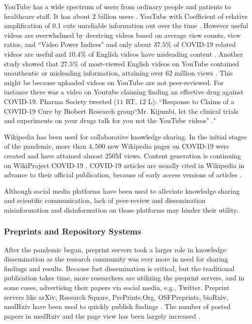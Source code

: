 \documentclass[acmsmall,authordraft]{acmart}
\begin{document}
YouTube has a wide spectrum of users from ordinary people and patients to healthcare staff. It has about $2$ billion users \citep{basnet2019quality}. YouTube with Coefficient of relative amplification of 0.1 cuts unreliable information out over the time \citep{cinelli2020covid}. However useful videos are overwhelmed by deceiving videos based on average view counts, view ratios, and ``Video Power Indices"  and only about $37.5$\% of COVID-19 related videos are useful and $10.4$\% of English videos have misleading content \citep{atac2020youtube}. Another study showed that $27.5$\% of most-viewed English videos on YouTube contained unauthentic or misleading information, attaining over $62$ million views \citep{li2020youtube}. This might be because uploaded videos on YouTube are not peer-reviewed. For instance there was a video on Youtube claiming finding an effective drug against COVID-19. Pharma Society tweeted ($11$ RT, $12$ L):  ``Response to Claims of a COVID-19 Cure by Biobert Research group``Mr. Kijumbi, let the clinical trials and experiments on your drugs talk for you not the YouTube videos" \citep{Pharma2020twitter}." 
 
Wikipedia has been used for collaborative knowledge sharing. In the initial stages of the pandemic, more than $4,500$ new Wikipedia pages on COVID-19 were created and have attained almost $250$M views. Content generation is continuing on WikiProject COVID-19 \citep{colavizza2020covid}. COVID-19 articles are usually cited in Wikipedia in advance to their official publication, because of early access versions of articles \citep{colavizza2020covid}.

Although social media platforms have been used to alleviate knowledge sharing and scientific communication, lack of peer-review and dissemination misinformation and disinformation on those platforms \citep{zarocostas2020fight} may hinder their utility.



\subsubsection{Preprints and Repository Systems}
\label{Preprints and Repository Systems}
After the pandemic began, preprint servers took a larger role in knowledge dissemination as the research community was ever more in need for sharing findings and results. Because fast dissemination is critical, but the traditional publication takes time, more researchers are utilizing the preprint servers, and in some cases, advertising their papers via social media, e.g., Twitter. Preprint servers like arXiv, Research Square, PrePrints.Org, OSFPreprints, bioRxiv, medRxiv have been used to quickly publish findings \citep{johansson2018preprints}. The number of posted papers in medRxiv and the page view has been largely increased \citep{Fox2020Twitter}. 
\end{document}

